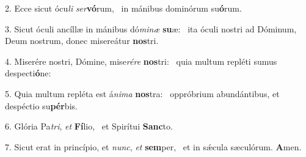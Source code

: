 2. Ecce sicut ócu\textit{li} \textit{ser}\textbf{vó}rum, \ast\  in mánibus dominórum su\textbf{ó}rum.\

3. Sicut óculi ancíllæ in mánibus dó\textit{mi}\textit{næ} \textbf{su}æ: \ast\  ita óculi nostri ad Dóminum, Deum nostrum, donec misereátur \textbf{nos}tri.\

4. Miserére nostri, Dómine, mise\textit{ré}\textit{re} \textbf{nos}tri: \ast\  quia multum repléti sumus despecti\textbf{ó}ne:\

5. Quia multum repléta est á\textit{ni}\textit{ma} \textbf{nos}tra: \ast\  oppróbrium abundántibus, et despéctio su\textbf{pér}bis.\

6. Glória Pa\textit{tri}, \textit{et} \textbf{Fí}lio, \ast\  et Spirítui \textbf{Sanc}to.\

7. Sicut erat in princípio, et \textit{nunc}, \textit{et} \textbf{sem}per, \ast\  et in sǽcula sæculórum. \textbf{A}men.\


